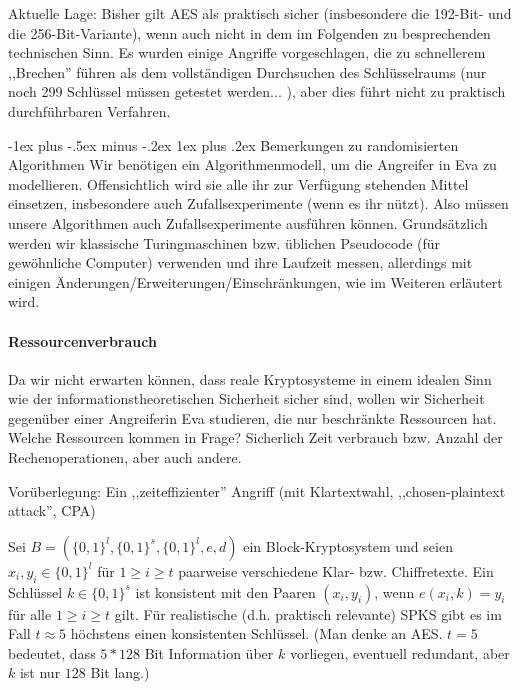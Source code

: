 \documentclass[a4paper]{article}
\makeatletter
\renewcommand{\subsubsection}{\@startsection{subsubsection}{3}{0mm}%
 {-1ex plus -.5ex minus -.2ex}%
 {1ex plus .2ex}%
 {\normalfont\small\bfseries}}
\makeatother
\begin{document}
\begin{multicols}{3}
    Aktuelle Lage:
    Bisher gilt AES als praktisch sicher (insbesondere die 192-Bit- und die 256-Bit-Variante), wenn auch nicht in dem im Folgenden zu besprechenden technischen Sinn. Es wurden einige Angriffe vorgeschlagen, die zu schnellerem ,,Brechen'' führen als dem vollständigen Durchsuchen des Schlüsselraums (nur noch 299 Schlüssel müssen getestet werden... ), aber dies führt nicht zu praktisch durchführbaren Verfahren.

    \subsubsection{Bemerkungen zu randomisierten Algorithmen}
    Wir benötigen ein Algorithmenmodell, um die Angreifer in Eva zu modellieren. Offensichtlich wird sie alle ihr zur Verfügung stehenden Mittel einsetzen, insbesondere auch Zufallsexperimente (wenn es ihr nützt). Also müssen unsere Algorithmen auch Zufallsexperimente ausführen können. Grundsätzlich werden wir klassische Turingmaschinen bzw. üblichen Pseudocode (für gewöhnliche Computer) verwenden und ihre Laufzeit messen, allerdings mit einigen Änderungen/Erweiterungen/Einschränkungen, wie im Weiteren erläutert wird.

    \paragraph{Ressourcenverbrauch}
    Da wir nicht erwarten können, dass reale Kryptosysteme in einem idealen Sinn wie der informationstheoretischen Sicherheit sicher sind, wollen wir Sicherheit gegenüber einer Angreiferin Eva studieren, die nur beschränkte Ressourcen hat. Welche Ressourcen kommen in Frage? Sicherlich Zeit verbrauch bzw. Anzahl der Rechenoperationen, aber auch andere.

    Vorüberlegung: Ein ,,zeiteffizienter'' Angriff (mit Klartextwahl, ,,chosen-plaintext attack'', CPA)

    Sei $B=(\{0,1\}^l,\{0,1\}^s,\{0,1\}^l,e,d)$ ein Block-Kryptosystem und seien $x_i,y_i\in\{0,1\}^l$ für $1\geq i\geq t$ paarweise verschiedene Klar- bzw. Chiffretexte. Ein Schlüssel $k\in\{0,1\}^s$ ist konsistent mit den Paaren $(x_i,y_i)$, wenn $e(x_i,k)=y_i$ für alle $1\geq i\geq t$ gilt. Für realistische (d.h. praktisch relevante) SPKS gibt es im Fall $t\approx 5$ höchstens einen konsistenten Schlüssel. (Man denke an AES. $t=5$ bedeutet, dass $5*128$ Bit Information über $k$ vorliegen, eventuell redundant, aber $k$ ist nur $128$ Bit lang.)


\end{multicols}
\end{document}
